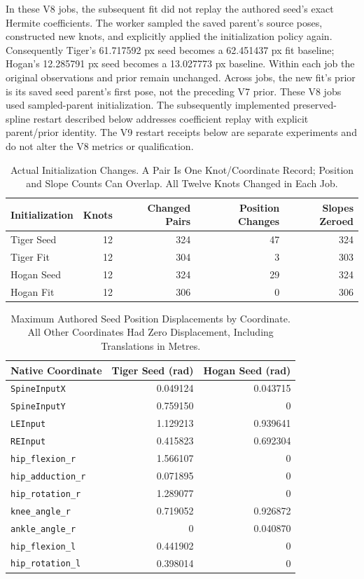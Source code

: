 \documentclass[11pt,letterpaper]{article}
\newcommand{\code}[1]{\nolinkurl{#1}}
\begin{document}
In these V8 jobs, the subsequent fit did not replay the authored seed's exact
Hermite coefficients. The worker sampled the saved parent's source poses, constructed new knots, and
explicitly applied the initialization policy again. Consequently Tiger's
61.717592 px seed becomes a 62.451437 px fit baseline; Hogan's 12.285791 px
seed becomes a 13.027773 px baseline. Within each job the original observations
and prior remain unchanged. Across jobs, the new fit's prior is its saved seed
parent's first pose, not the preceding V7 prior. These V8 jobs used sampled-parent initialization. The subsequently implemented
preserved-spline restart described below addresses coefficient replay with
explicit parent/prior identity. The V9 restart receipts below are separate
experiments and do not alter the V8 metrics or qualification.

\begin{table}[ht]
\centering\small
\begin{tabular}{@{}lrrrr@{}}
\toprule Initialization & Knots & Changed Pairs & Position Changes & Slopes Zeroed\\\midrule
Tiger Seed & 12 & 324 & 47 & 324\\
Tiger Fit & 12 & 304 & 3 & 303\\
Hogan Seed & 12 & 324 & 29 & 324\\
Hogan Fit & 12 & 306 & 0 & 306\\
\bottomrule
\end{tabular}
\caption{Actual Initialization Changes. A Pair Is One Knot/Coordinate Record;
Position and Slope Counts Can Overlap. All Twelve Knots Changed in Each Job.}
\end{table}

\begin{table}[ht]
\centering\small
\begin{tabular}{@{}lrr@{}}
\toprule Native Coordinate & Tiger Seed (rad) & Hogan Seed (rad)\\\midrule
\code{SpineInputX} & 0.049124 & 0.043715\\
\code{SpineInputY} & 0.759150 & 0\\
\code{LEInput} & 1.129213 & 0.939641\\
\code{REInput} & 0.415823 & 0.692304\\
\code{hip_flexion_r} & 1.566107 & 0\\
\code{hip_adduction_r} & 0.071895 & 0\\
\code{hip_rotation_r} & 1.289077 & 0\\
\code{knee_angle_r} & 0.719052 & 0.926872\\
\code{ankle_angle_r} & 0 & 0.040870\\
\code{hip_flexion_l} & 0.441902 & 0\\
\code{hip_rotation_l} & 0.398014 & 0\\
\bottomrule
\end{tabular}
\caption{Maximum Authored Seed Position Displacements by Coordinate. All Other
Coordinates Had Zero Displacement, Including Translations in Metres.}
\end{table}
\end{document}
